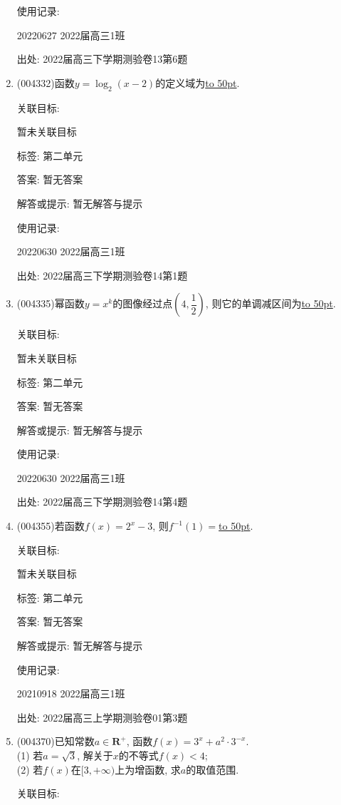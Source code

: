 \documentclass[10pt,a4paper]{article}
\newcommand{\blank}[1]{\underline{\hbox to #1pt{}}}
\begin{document}
\begin{enumerate}[1.]
使用记录:

20220627	2022届高三1班	


出处: 2022届高三下学期测验卷13第6题
\item { (004332)}函数$y=\log_2(x-2)$的定义域为\blank{50}.


关联目标:

暂未关联目标



标签: 第二单元

答案: 暂无答案

解答或提示: 暂无解答与提示

使用记录:

20220630	2022届高三1班	


出处: 2022届高三下学期测验卷14第1题
\item { (004335)}幂函数$y=x^k$的图像经过点$(4,\dfrac 12)$, 则它的单调减区间为\blank{50}.


关联目标:

暂未关联目标



标签: 第二单元

答案: 暂无答案

解答或提示: 暂无解答与提示

使用记录:

20220630	2022届高三1班	


出处: 2022届高三下学期测验卷14第4题
\item { (004355)}若函数$f(x)=2^x-3$, 则$f^{-1}(1)=$\blank{50}.


关联目标:

暂未关联目标



标签: 第二单元

答案: 暂无答案

解答或提示: 暂无解答与提示

使用记录:

20210918	2022届高三1班	


出处: 2022届高三上学期测验卷01第3题
\item { (004370)}已知常数$a\in \mathbf{R}^+$, 函数$f(x)=3^x+a^2\cdot 3^{-x}$.\\
(1) 若$a=\sqrt 3$, 解关于$x$的不等式$f(x)<4$;\\
(2) 若$f(x)$在$[3,+\infty)$上为增函数, 求$a$的取值范围.


关联目标:


\end{enumerate}
\end{document}
